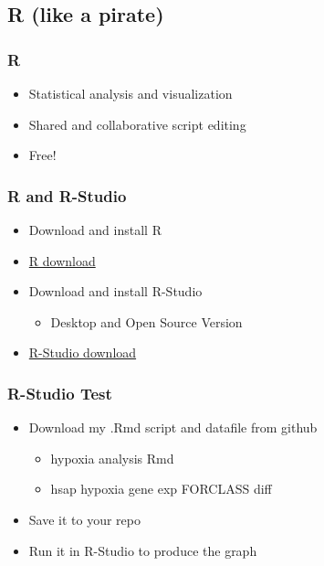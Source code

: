 \documentclass[14pt]{beamer}
\begin{document}
\subsection{R (like a pirate)}

\begin{frame}
\frametitle{R}
\begin{itemize}
	\item Statistical analysis and visualization
	\item Shared and collaborative script editing
	\item Free!
\end{itemize}
\end{frame}

\begin{frame}
\frametitle{R and R-Studio}
\begin{itemize}
	\item Download and install R
	\item \href{https://cran.rstudio.com/}{R download}
	\item Download and install R-Studio
	\begin{itemize}
		\item Desktop and Open Source Version
	\end{itemize}
	\item \href{https://www.rstudio.com/products/rstudio/download/}{R-Studio download}
\end{itemize}
\end{frame}

\begin{frame}
\frametitle{R-Studio Test}
\begin{itemize}
	\item Download my .Rmd script and datafile from github
	\begin{itemize}
		\item hypoxia analysis Rmd
		\item hsap hypoxia gene exp FORCLASS diff
	\end{itemize}
	\item Save it to your repo
	\item Run it in R-Studio to produce the graph
\end{itemize}
\end{frame}
\end{document}
